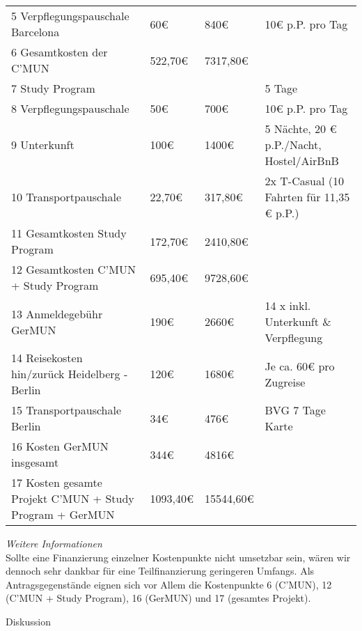 {\begin{tabular}{p{4cm} p{1cm} p{1cm} p{9cm}}
        5 Verpflegungspauschale Barcelona & 60€ & 840€ & 10€ p.P. pro Tag\\
        6 Gesamtkosten der C'MUN & 522,70€ & 7317,80€ &\\
        7 Study Program & & & 5 Tage\\
        8 Verpflegungspauschale & 50€ & 700€ & 10€ p.P. pro Tag\\
        9 Unterkunft & 100€ & 1400€ & 5 Nächte, 20 € p.P./Nacht, Hostel/AirBnB\\
        10 Transportpauschale & 22,70€ & 317,80€ & 2x T-Casual (10 Fahrten für 11,35 € p.P.)\\
        11 Gesamtkosten Study Program & 172,70€ & 2410,80€ & \\
        12 Gesamtkosten C'MUN + Study Program & 695,40€ & 9728,60€ &\\
        13 Anmeldegebühr GerMUN & 190€ & 2660€ & 14 x inkl. Unterkunft \& Verpflegung\\
        14 Reisekosten hin/zurück Heidelberg - Berlin & 120€ & 1680€ & Je ca. 60€ pro Zugreise\\
        15 Transportpauschale Berlin & 34€ & 476€ & BVG 7 Tage Karte\\
        16 Kosten GerMUN insgesamt & 344€ & 4816€ &\\
        17 Kosten gesamte Projekt C'MUN + Study Program + GerMUN & 1093,40€ & 15544,60€ &\\
    \end{tabular}
    \emph{Weitere Informationen}\\
    Sollte eine Finanzierung einzelner Kostenpunkte nicht umsetzbar sein, wären wir dennoch sehr dankbar für eine Teilfinanzierung geringeren Umfangs. Als Antragsgegenstände eignen sich vor Allem die Kostenpunkte 6 (C’MUN), 12 (C’MUN + Study Program), 16 (GerMUN) und 17 (gesamtes Projekt).
}{
    Diskussion
}

